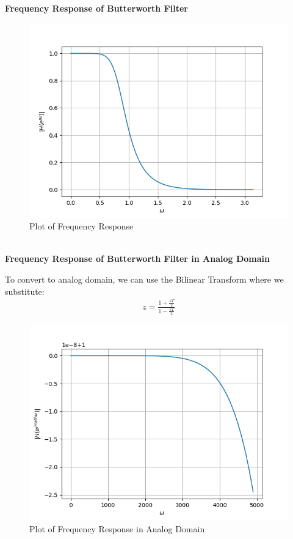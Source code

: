 \documentclass[journal,12pt,twocolumn]{IEEEtran}
\theoremstyle{remark}
\renewcommand\thesection{\arabic{section}}
\numberwithin{equation}{subsection}
\begin{document}
\begin{enumerate}[label=\thesection.\arabic*]
\newpage
\textbf{Frequency Response of Butterworth Filter}
\begin{figure}[!h]
    \centering
    \includegraphics[width = \columnwidth]{figs/7.2hw.png}
    \caption{Plot of Frequency Response}
    \label{fig:7.2hw}
\end{figure}
\\
\textbf{Frequency Response of Butterworth Filter in Analog Domain}

To convert to analog domain, we can use the Bilinear Transform where we substitute:
\begin{align}
    z=\frac{1+\frac{sT}{2}}{{1-\frac{sT}{2}}}
\end{align}
\begin{figure}[!h]
    \centering
    \includegraphics[width = \columnwidth]{figs/7.2bt.png}
    \caption{Plot of Frequency Response in Analog Domain}
    \label{fig:7.2bt}
\end{figure}


\end{enumerate}
\end{document}
